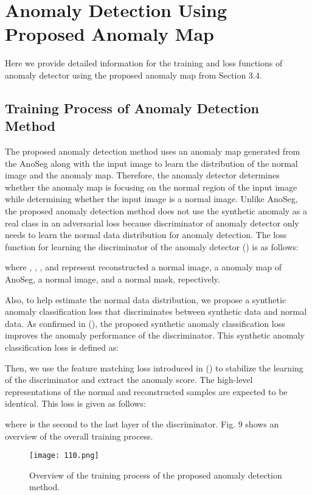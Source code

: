 \documentclass{article} \usepackage{iclr2022_conference,times}
\begin{document}



\appendix
\section{Anomaly Detection Using Proposed Anomaly Map}
Here we provide detailed information for the training and loss functions of anomaly detector using the proposed anomaly map from Section 3.4.
\subsection{Training Process of Anomaly Detection Method}
The proposed anomaly detection method uses an anomaly map generated from the AnoSeg along with the input image to learn the distribution of the normal image and the anomaly map. Therefore, the anomaly detector determines whether the anomaly map is focusing on the normal region of the input image while determining whether the input image is a normal image. Unlike AnoSeg, the proposed anomaly detection method does not use the synthetic anomaly  as a real class in an adversarial loss because discriminator of anomaly detector only needs to learn the normal data distribution for anomaly detection. The loss function for learning the discriminator of the anomaly detector () is as follows:

where , , , and  represent reconstructed a normal image, a anomaly map of AnoSeg, a normal image, and a normal mask, repectively.

Also, to help estimate the normal data distribution, we propose a synthetic anomaly classification loss that discriminates between synthetic data and normal data. As confirmed in (\cite{semi}), the proposed synthetic anomaly classification loss improves the anomaly performance of the discriminator. This synthetic anomaly classification loss is defined as:


Then, we use the feature matching loss introduced in (\cite{imp}) to stabilize the learning of the discriminator and extract the anomaly score. The high-level representations of the normal and reconstructed samples are expected to be identical. This loss is given as follows:

where  is the second to the last layer of the discriminator. Fig. 9 shows an overview of the overall training process.
\begin{figure}[t]
\begin{center}
\texttt{[image: 110.png]} 
\end{center}
\vspace{-0.2cm}
  \caption{Overview of the training process of the proposed anomaly detection method.}
\label{fig2}
\end{figure}
\end{document}
